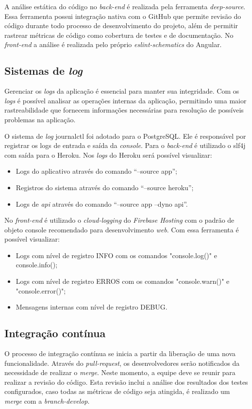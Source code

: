 A análise estática do código no \textit{\gls{back-end}} é realizada pela ferramenta \textit{\gls{deep-source}}. Essa ferramenta possui integração nativa com o GitHub que permite revisão do código durante todo processo de desenvolvimento do projeto, além de permitir rastrear métricas de código como cobertura de testes e de documentação. No \textit{\gls{front-end}} a análise é realizada pelo próprio \textit{\gls{eslint-schematics}} do Angular.


\subsection{Sistemas de \textit{log}}
Gerenciar os \textit{\glspl{log}} da aplicação é essencial para manter sua integridade. Com os \textit{\glspl{log}} é possível analisar as operações internas da aplicação, permitindo uma maior rastreabilidade que fornecem informações necessárias para resolução de possíveis problemas na aplicação.


O sistema de \textit{\gls{log}} \gls{journalctl} foi adotado para o PostgreSQL. Ele é responsável por registrar os logs de entrada e saída da \textit{console}. 
Para o \textit{\gls{back-end}} é utilizado o \ac{slf4j} com saída para o Heroku.  Nos \textit{\glspl{log}}  do Heroku será possível visualizar: 
\begin{itemize}
\item Logs do aplicativo através do comando “--source app”;
\item Registros do sistema através do comando “--source heroku”;
\item Logs de \textit{\ac{api}} através do comando “--source app --dyno api”.
\end{itemize}


No \textit{front-end} é utilizado o \textit{\gls{cloud-logging}} do \textit{Firebase Hosting} com o padrão de objeto console recomendado para desenvolvimento \textit{web}. Com essa ferramenta é possível visualizar:
\begin{itemize}
\item Logs com nível de registro INFO com os comandos "console.log()" e console.info();
\item Logs com nível de registro ERROS com os comandos "console.warn()" e "console.error()";
\item Mensagens internas com nível de registro DEBUG.
\end{itemize}

\subsection{Integração contínua}
O processo de integração contínua se inicia a partir da liberação de uma nova funcionalidade. Através do \textit{\gls{pull-request}}, os desenvolvedores serão notificados da necessidade de realizar o \textit{\gls{merge}}. Neste momento, a equipe deve se reunir para realizar a revisão do código. Esta revisão inclui a análise dos resultados dos testes configurados, caso todas as métricas de código seja atingida, é realizado um \textit{\gls{merge}} com a \textit{\gls{branch-develop}}. 


